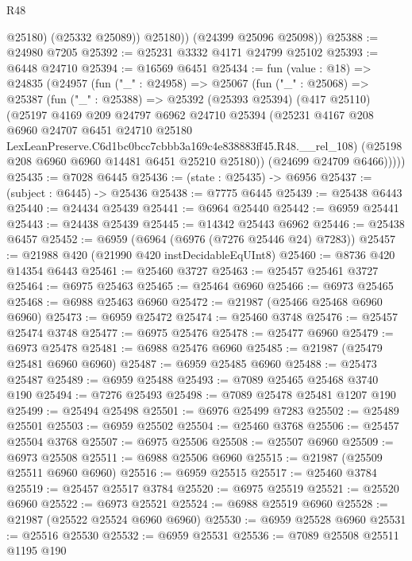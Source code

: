 \begin{lexlean}{R48}
\begin{coremodule}
              @25180)
            (@25332 @25089))
          @25180))
      (@24399 @25096 @25098))
@25388 := @24980 @7205
@25392 := @25231 @3332 @4171 @24799 @25102
@25393 := @6448 @24710
@25394 := @16569 @6451
@25434 := fun (value : @18) =>
  @24835
    (@24957
      (fun ("_" : @24958) =>
      @25067
        (fun ("_" : @25068) =>
        @25387
          (fun ("_" : @25388) =>
          @25392
            (@25393 @25394)
            (@417 @25110)
            (@25197
              @4169
              @209
              @24797
              @6962
              @24710
              @25394
              (@25231
                @4167
                @208
                @6960
                @24707
                @6451
                @24710
                @25180
                LexLeanPreserve.C6d1bc0bcc7cbbb3a169c4e838883ff45.R48.__rel_108)
              (@25198 @208 @6960 @6960 @14481 @6451 @25210 @25180))
            (@24699 @24709 @6466)))))
@25435 := @7028 @6445
@25436 := (state : @25435) -> @6956
@25437 := (subject : @6445) -> @25436
@25438 := @7775 @6445
@25439 := @25438 @6443
@25440 := @24434 @25439
@25441 := @6964 @25440
@25442 := @6959 @25441
@25443 := @24438 @25439
@25445 := @14342 @25443 @6962
@25446 := @25438 @6457
@25452 := @6959 (@6964 (@6976 (@7276 @25446 @24) @7283))
@25457 := @21988 @420 (@21990 @420 instDecidableEqUInt8)
@25460 := @8736 @420 @14354 @6443
@25461 := @25460 @3727
@25463 := @25457 @25461 @3727
@25464 := @6975 @25463
@25465 := @25464 @6960
@25466 := @6973 @25465
@25468 := @6988 @25463 @6960
@25472 := @21987 (@25466 @25468 @6960 @6960)
@25473 := @6959 @25472
@25474 := @25460 @3748
@25476 := @25457 @25474 @3748
@25477 := @6975 @25476
@25478 := @25477 @6960
@25479 := @6973 @25478
@25481 := @6988 @25476 @6960
@25485 := @21987 (@25479 @25481 @6960 @6960)
@25487 := @6959 @25485 @6960
@25488 := @25473 @25487
@25489 := @6959 @25488
@25493 := @7089 @25465 @25468 @3740 @190
@25494 := @7276 @25493
@25498 := @7089 @25478 @25481 @1207 @190
@25499 := @25494 @25498
@25501 := @6976 @25499 @7283
@25502 := @25489 @25501
@25503 := @6959 @25502
@25504 := @25460 @3768
@25506 := @25457 @25504 @3768
@25507 := @6975 @25506
@25508 := @25507 @6960
@25509 := @6973 @25508
@25511 := @6988 @25506 @6960
@25515 := @21987 (@25509 @25511 @6960 @6960)
@25516 := @6959 @25515
@25517 := @25460 @3784
@25519 := @25457 @25517 @3784
@25520 := @6975 @25519
@25521 := @25520 @6960
@25522 := @6973 @25521
@25524 := @6988 @25519 @6960
@25528 := @21987 (@25522 @25524 @6960 @6960)
@25530 := @6959 @25528 @6960
@25531 := @25516 @25530
@25532 := @6959 @25531
@25536 := @7089 @25508 @25511 @1195 @190

\end{coremodule}
\end{lexlean}
